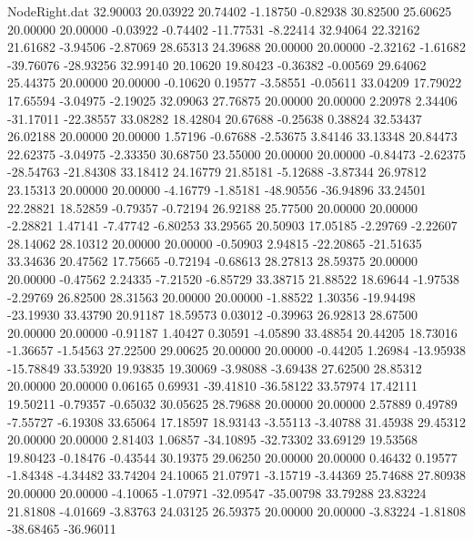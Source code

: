 \begin{filecontents}{NodeRight.dat}
  32.90003   20.03922   20.74402    -1.18750   -0.82938   30.82500   25.60625   20.00000   20.00000   -0.03922   -0.74402  -11.77531   -8.22414
  32.94064   22.32162   21.61682    -3.94506   -2.87069   28.65313   24.39688   20.00000   20.00000   -2.32162   -1.61682  -39.76076  -28.93256
  32.99140   20.10620   19.80423    -0.36382   -0.00569   29.64062   25.44375   20.00000   20.00000   -0.10620    0.19577   -3.58551   -0.05611
  33.04209   17.79022   17.65594    -3.04975   -2.19025   32.09063   27.76875   20.00000   20.00000    2.20978    2.34406  -31.17011  -22.38557
  33.08282   18.42804   20.67688    -0.25638    0.38824   32.53437   26.02188   20.00000   20.00000    1.57196   -0.67688   -2.53675    3.84146
  33.13348   20.84473   22.62375    -3.04975   -2.33350   30.68750   23.55000   20.00000   20.00000   -0.84473   -2.62375  -28.54763  -21.84308
  33.18412   24.16779   21.85181    -5.12688   -3.87344   26.97812   23.15313   20.00000   20.00000   -4.16779   -1.85181  -48.90556  -36.94896
  33.24501   22.28821   18.52859    -0.79357   -0.72194   26.92188   25.77500   20.00000   20.00000   -2.28821    1.47141   -7.47742   -6.80253
  33.29565   20.50903   17.05185    -2.29769   -2.22607   28.14062   28.10312   20.00000   20.00000   -0.50903    2.94815  -22.20865  -21.51635
  33.34636   20.47562   17.75665    -0.72194   -0.68613   28.27813   28.59375   20.00000   20.00000   -0.47562    2.24335   -7.21520   -6.85729
  33.38715   21.88522   18.69644    -1.97538   -2.29769   26.82500   28.31563   20.00000   20.00000   -1.88522    1.30356  -19.94498  -23.19930
  33.43790   20.91187   18.59573     0.03012   -0.39963   26.92813   28.67500   20.00000   20.00000   -0.91187    1.40427    0.30591   -4.05890
  33.48854   20.44205   18.73016    -1.36657   -1.54563   27.22500   29.00625   20.00000   20.00000   -0.44205    1.26984  -13.95938  -15.78849
  33.53920   19.93835   19.30069    -3.98088   -3.69438   27.62500   28.85312   20.00000   20.00000    0.06165    0.69931  -39.41810  -36.58122
  33.57974   17.42111   19.50211    -0.79357   -0.65032   30.05625   28.79688   20.00000   20.00000    2.57889    0.49789   -7.55727   -6.19308
  33.65064   17.18597   18.93143    -3.55113   -3.40788   31.45938   29.45312   20.00000   20.00000    2.81403    1.06857  -34.10895  -32.73302
  33.69129   19.53568   19.80423    -0.18476   -0.43544   30.19375   29.06250   20.00000   20.00000    0.46432    0.19577   -1.84348   -4.34482
  33.74204   24.10065   21.07971    -3.15719   -3.44369   25.74688   27.80938   20.00000   20.00000   -4.10065   -1.07971  -32.09547  -35.00798
  33.79288   23.83224   21.81808    -4.01669   -3.83763   24.03125   26.59375   20.00000   20.00000   -3.83224   -1.81808  -38.68465  -36.96011

\end{filecontents}

